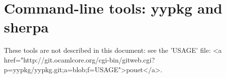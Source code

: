 \documentclass[a4paper]{article}
\begin{document}
% 
% 
% 
% 

\section{Command-line tools: yypkg and sherpa}
These tools are not described in this document: see the 'USAGE' file:
<a href="http://git.ocamlcore.org/cgi-bin/gitweb.cgi?p=yypkg/yypkg.git;a=blob;f=USAGE">pouet</a>.
\end{document}
